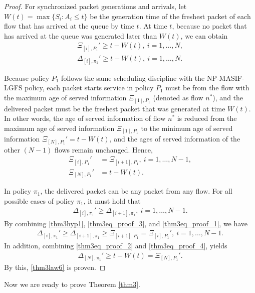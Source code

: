\begin{proof}
For synchronized packet generations and arrivals,  let $W(t) = \max\{S_i: A_i \leq t\}$ 
be the generation time of the freshest packet of each flow that has arrived at the queue by time $t$. At time $t$, because no packet that has arrived at the queue was generated later than $W(t)$, we can obtain
\begin{align}%
\Xi_{[i],P_1}' \geq t-W(t),~i=1,\ldots,N,\\
\Delta_{[i],\pi_1}' \geq t-W(t),~i=1,\ldots,N.\label{thm3eq_proof_2}
\end{align} 

Because policy $P_1$ follows the same scheduling discipline with the NP-MASIF-LGFS policy, each  packet starts service in policy $P_1$ must be from the flow with the maximum  age of served information $\Xi_{[1],P_1}$ (denoted as flow $n^*$), and the delivered packet must be the freshest packet that was generated at time $W(t)$. In other words, the age of served information of flow $n^*$ is reduced from the maximum age of served information $\Xi_{[1],P_1}$ to the minimum age of served information $\Xi_{[N],P_1}'=t-W(t)$, and the ages of served information of the other $(N-1)$ flows remain unchanged. Hence, 
\begin{align}\label{thm3eq_proof_3}
\Xi_{[i],P_1}' &= \Xi_{[i+1],P_1},~i=1,\ldots,N-1,\\
\Xi_{[N],P_1}' &= t - W(t). \label{thm3eq_proof_4}
\end{align}

In policy $\pi_1$, the delivered packet can be any packet from any flow. For all possible cases of policy $\pi_1$, it must hold that 
\begin{align}\label{thm3eq_proof_1}
\Delta_{[i],\pi_1}' \geq \Delta_{[i+1],\pi_1},~i=1,\ldots,N-1. 
\end{align}
By combining \eqref{thm3hyp1}, \eqref{thm3eq_proof_3}, and \eqref{thm3eq_proof_1}, we have
\begin{align}
\Delta_{[i],\pi_1}' \geq \Delta_{[i+1],\pi_1} \geq \Xi_{[i+1],P_1} = \Xi_{[i],P_1}',~i=1,\ldots,N-1.\nonumber
\end{align}
In addition, combining \eqref{thm3eq_proof_2} and \eqref{thm3eq_proof_4}, yields
\begin{align}
\Delta_{[N],\pi_1}' \geq  t-W(t) = \Xi_{[N],P_1}'.\nonumber
\end{align}
By this, \eqref{thm3law6} is proven.
\end{proof}
Now we are ready to prove Theorem \ref{thm3}.
